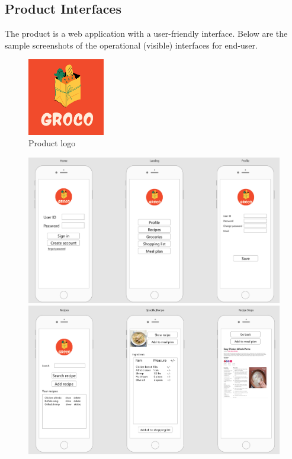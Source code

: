 \subsection{Product Interfaces}
The product is a web application with a user-friendly interface. Below are the sample screenshots of the operational (visible) interfaces for end-user. 
\begin{figure}[!h]
	\centering
   	\includegraphics[width=0.3\textwidth]{images/productLogo.png}
    \caption{Product logo}
\end{figure}
\begin{figure}[!h]
	\centering
   	\includegraphics[width=1\textwidth]{images/I1.PNG}
   	\includegraphics[width=1\textwidth]{images/I2.PNG}
\end{figure}  
